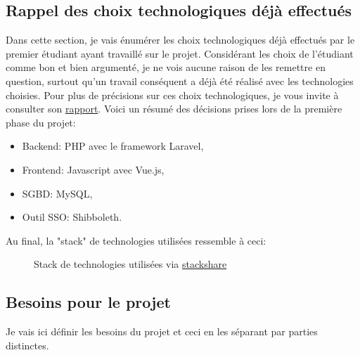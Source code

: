 \documentclass[
    iai, %
    il, %
]{heig-tb}
\begin{document}
\subsection{Rappel des choix technologiques déjà effectués}
Dans cette section, je vais énumérer les choix technologiques déjà effectués par le premier étudiant ayant travaillé sur le projet.
Considérant les choix de l'étudiant comme bon et bien argumenté, je ne vois aucune raison de les remettre en question, surtout qu'un travail conséquent a déjà été réalisé avec les technologies choisies. Pour plus de précisions sur ces choix technologiques, je vous invite à consulter son \href{TODO}{rapport}.
Voici un résumé des décisions prises lors de la première phase du projet:
\begin{itemize}
    \item Backend: PHP avec le framework Laravel, %
    \item Frontend: Javascript avec Vue.js, %
    \item SGBD: MySQL, %
    \item Outil SSO: Shibboleth. %
\end{itemize}

Au final, la "stack" de technologies utilisées ressemble à ceci:

\begin{figure}
    \caption{Stack de technologies utilisées via \href{https://stackshare.io/alecberney/bachelors-thesis}{stackshare}}
\end{figure}

\subsection{Besoins pour le projet}
Je vais ici définir les besoins du projet et ceci en les séparant par parties distinctes.
\end{document}
